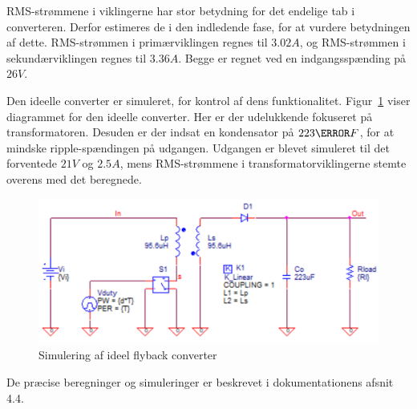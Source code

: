RMS-strømmene i viklingerne har stor betydning for det endelige tab i converteren. Derfor estimeres de i den indledende fase, for at vurdere betydningen af dette. RMS-strømmen i primærviklingen regnes til $3.02A$, og RMS-strømmen i sekundærviklingen regnes til $3.36A$. Begge er regnet ved en indgangsspænding på $26V$. 

Den ideelle converter er simuleret, for kontrol af dens funktionalitet. Figur~\ref{fig:flyabck_ideal_diagram} viser diagrammet for den ideelle converter. Her er der udelukkende fokuseret på transformatoren. Desuden er der indsat en kondensator på $223\micro F$, for at mindske ripple-spændingen på udgangen. Udgangen er blevet simuleret til det forventede $21V$ og $2.5A$, mens RMS-strømmene i transformatorviklingerne stemte overens med det beregnede. 

\begin{figure}[H]
	\centering
	\includegraphics[width=0.7\linewidth]{../Dokumentation/tex/1iteration/billeder/flyback_ideal_diagram.png}
	\caption{Simulering af ideel flyback converter}
	\label{fig:flyabck_ideal_diagram}
\end{figure}

\noindent De præcise beregninger og simuleringer er beskrevet i dokumentationens afsnit 4.4.






